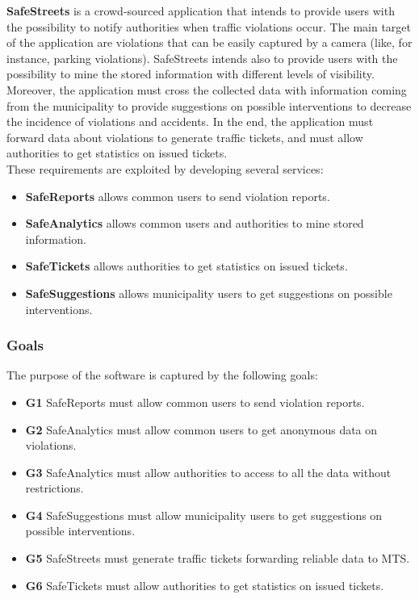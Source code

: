 \documentclass[a4paper]{article}
\begin{document}
\textbf{SafeStreets} is a crowd-sourced application that intends to
provide users with the possibility to notify authorities when traffic
violations occur. The main target of the application are violations that
can be easily captured by a camera (like, for instance, parking
violations). SafeStreets intends also to provide users with the
possibility to mine the stored information with different levels of
visibility. Moreover, the application must cross the collected data with
information coming from the municipality to provide suggestions on
possible interventions to decrease the incidence of violations and
accidents. In the end, the application must forward data about
violations to generate traffic tickets, and must allow authorities to
get statistics on issued tickets.
\medskip\\
These requirements are exploited by developing several services:
\begin{itemize}
\item
  \textbf{SafeReports} allows common users to send violation reports.
\item
  \textbf{SafeAnalytics} allows common users and authorities to mine
  stored information.
\item
  \textbf{SafeTickets} allows authorities to get statistics on issued
  tickets.
\item
  \textbf{SafeSuggestions} allows municipality users to get suggestions
  on possible interventions.
\end{itemize}

\subsubsection{Goals}

The purpose of the software is captured by the following goals:
\begin{itemize}
\item
  \textbf{G1} SafeReports must allow common users to send violation
  reports.
\item
  \textbf{G2} SafeAnalytics must allow common users to get anonymous
  data on violations.
\item
  \textbf{G3} SafeAnalytics must allow authorities to access to all the
  data without restrictions.
\item
  \textbf{G4} SafeSuggestions must allow municipality users to get
  suggestions on possible interventions.
\item
  \textbf{G5} SafeStreets must generate traffic tickets forwarding
  reliable data to MTS.
\item
  \textbf{G6} SafeTickets must allow authorities to get statistics on
  issued tickets.
\end{itemize}
\end{document}
